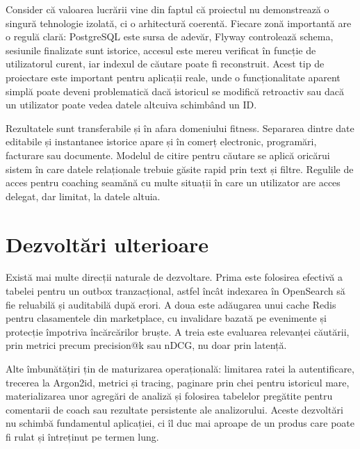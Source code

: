 Consider că valoarea lucrării vine din faptul că proiectul nu demonstrează o singură tehnologie izolată,
ci o arhitectură coerentă. Fiecare zonă importantă are o regulă clară: PostgreSQL este sursa de adevăr,
Flyway controlează schema, sesiunile finalizate sunt istorice, accesul este mereu verificat în funcție
de utilizatorul curent, iar indexul de căutare poate fi reconstruit. Acest tip de proiectare este
important pentru aplicații reale, unde o funcționalitate aparent simplă poate deveni problematică dacă
istoricul se modifică retroactiv sau dacă un utilizator poate vedea datele altcuiva schimbând un ID.

Rezultatele sunt transferabile și în afara domeniului fitness. Separarea dintre date editabile și
instantanee istorice apare și în comerț electronic, programări, facturare sau documente. Modelul de
citire pentru căutare se aplică oricărui sistem în care datele relaționale trebuie găsite rapid prin
text și filtre. Regulile de acces pentru coaching seamănă cu multe situații în care un utilizator are
acces delegat, dar limitat, la datele altuia.

\section{Dezvoltări ulterioare}

Există mai multe direcții naturale de dezvoltare. Prima este folosirea efectivă a tabelei
 pentru un outbox tranzacțional, astfel încât indexarea în OpenSearch să fie
reluabilă și auditabilă după erori. A doua este adăugarea unui cache Redis pentru clasamentele din
marketplace, cu invalidare bazată pe evenimente și protecție împotriva încărcărilor bruște. A treia
este evaluarea relevanței căutării, prin metrici precum precision@k sau nDCG, nu doar prin latență.

Alte îmbunătățiri țin de maturizarea operațională: limitarea ratei la autentificare, trecerea la
Argon2id, metrici și tracing, paginare prin chei pentru istoricul mare, materializarea unor agregări de
analiză și folosirea tabelelor pregătite pentru comentarii de coach sau rezultate persistente ale
analizorului. Aceste dezvoltări nu schimbă fundamentul aplicației, ci îl duc mai aproape de un produs
care poate fi rulat și întreținut pe termen lung.
